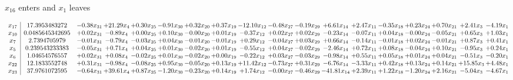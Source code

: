 \documentclass[9pt]{article}
\begin{document}
 $ x_{16} $ enters and $ x_{1} $ leaves 

 \[\begin{array}{c| c c@{\hskip 2pt} c@{\hskip 2pt} c@{\hskip 2pt} c@{\hskip 2pt} c@{\hskip 2pt} c@{\hskip 2pt} c@{\hskip 2pt} c@{\hskip 2pt} c@{\hskip 2pt} c@{\hskip 2pt} c@{\hskip 2pt} c@{\hskip 2pt} c@{\hskip 2pt} c@{\hskip 2pt} c@{\hskip 2pt} c@{\hskip 2pt} }
 x_{17}   &  17.3953483272 & -0.38 x_{31} & + 21.29 x_{4} & +  0.30 x_{25} & -0.91 x_{30} & +  0.32 x_{20} & +  0.37 x_{19} & -12.10 x_{12} & -0.48 x_{27} & -0.19 x_{29} & +  6.61 x_{14} & +  2.47 x_{11} & -0.35 x_{18} & +  0.23 x_{24} & +  0.70 x_{21} & +  2.41 x_{3} & -4.19 x_{1}\\
 x_{10}   &  0.0485645342695 & +  0.02 x_{31} & -0.89 x_{4} & +  0.00 x_{25} & +  0.10 x_{30} & -0.00 x_{20} & +  0.01 x_{19} & -0.37 x_{12} & +  0.02 x_{27} & +  0.02 x_{29} & -0.23 x_{14} & -0.07 x_{11} & +  0.04 x_{18} & -0.00 x_{24} & -0.05 x_{21} & +  0.65 x_{3} & +  1.03 x_{1}\\
 x_{7}   &  2.7394705979 & -0.01 x_{31} & -0.79 x_{4} & -0.03 x_{25} & +  0.04 x_{30} & -0.01 x_{20} & -0.01 x_{19} & +  0.29 x_{12} & -0.04 x_{27} & +  0.03 x_{29} & +  0.66 x_{14} & -0.14 x_{11} & -0.01 x_{18} & +  0.02 x_{24} & -0.01 x_{21} & +  0.87 x_{3} & +  0.41 x_{1}\\
 x_{5}   &  0.239543233383 & -0.05 x_{31} & +  0.71 x_{4} & +  0.04 x_{25} & +  0.01 x_{30} & -0.02 x_{20} & +  0.01 x_{19} & -0.55 x_{12} & +  0.04 x_{27} & -0.02 x_{29} & -2.46 x_{14} & +  0.72 x_{11} & +  0.08 x_{18} & -0.04 x_{24} & +  0.10 x_{21} & -0.95 x_{3} & +  0.24 x_{1}\\
 x_{6}   &  1.04654576557 & +  0.02 x_{31} & +  0.08 x_{4} & -0.02 x_{25} & +  0.01 x_{30} & -0.02 x_{20} & +  0.00 x_{19} & -0.22 x_{12} & +  0.03 x_{27} & -0.03 x_{29} & -0.98 x_{14} & +  0.55 x_{11} & +  0.05 x_{18} & +  0.01 x_{24} & +  0.04 x_{21} & -0.51 x_{3} & -0.20 x_{1}\\
 x_{22}   &  12.1833552748 & +  0.31 x_{31} & -0.98 x_{4} & -0.08 x_{25} & +  0.95 x_{30} & -0.05 x_{20} & +  0.13 x_{19} & + 11.42 x_{12} & -0.73 x_{27} & +  0.31 x_{29} & -6.76 x_{14} & -3.33 x_{11} & +  0.42 x_{18} & +  0.13 x_{24} & +  0.14 x_{21} & + 15.85 x_{3} & +  4.48 x_{1}\\
 x_{23}   &  37.9761072595 & -0.64 x_{31} & + 39.61 x_{4} & +  0.87 x_{25} & -1.20 x_{30} & -0.23 x_{20} & +  0.14 x_{19} & +  1.74 x_{12} & -0.00 x_{27} & -0.46 x_{29} & -41.81 x_{14} & +  2.39 x_{11} & +  1.22 x_{18} & -1.20 x_{24} & +  2.16 x_{21} & -5.04 x_{3} & -4.67 x_{1}\\

\end{array}\]
\end{document}
